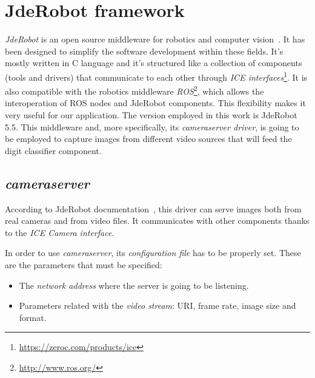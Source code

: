 \section{JdeRobot framework}\label{sec:jderobot}
\emph{JdeRobot} is an open source middleware for robotics and computer vision~\cite{jderobot}. It has been designed to simplify the software development within these fields. It's mostly written in C\nolinebreak[4]\hspace{-.05em}\raisebox{.4ex}{\tiny\bf ++} language and it's structured like a collection of components (tools and drivers) that communicate to each other through \emph{ICE interfaces}\footnote{\url{https://zeroc.com/products/ice}}. It is also compatible with the robotics middleware \emph{ROS}\footnote{\url{http://www.ros.org/}}, which allows the interoperation of ROS nodes and JdeRobot components. This flexibility makes it very useful for our application. The version employed in this work is JdeRobot 5.5. This middleware and, more specifically, its \emph{\textit{cameraserver} driver}, is going to be employed to capture images from different video sources that will feed the digit classifier component.

\subsection* {\textit{cameraserver}}
According to JdeRobot documentation~\cite{jderobot}, this driver can serve images both from real cameras and from video files. It communicates with other components thanks to the \emph{ICE \textit{Camera} interface}.

In order to use \textit{cameraserver}, its \emph{configuration file} has to be properly set. These are the parameters that must be specified:
\begin{itemize}
	\item The \emph{network address} where the server is going to be listening.
	
	\item Parameters related with the \emph{video stream}: URI, frame rate, image size and format.
\end{itemize}

